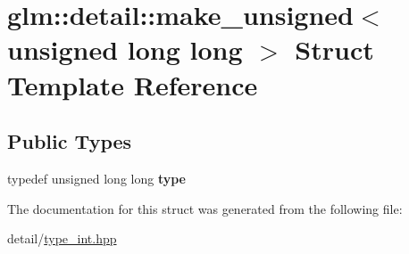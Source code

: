 \hypertarget{structglm_1_1detail_1_1make__unsigned_3_01unsigned_01long_01long_01_4}{\section{glm\-:\-:detail\-:\-:make\-\_\-unsigned$<$ unsigned long long $>$ Struct Template Reference}
\label{structglm_1_1detail_1_1make__unsigned_3_01unsigned_01long_01long_01_4}
}
\subsection*{Public Types}
\begin{DoxyCompactItemize}
\item 
\hypertarget{structglm_1_1detail_1_1make__unsigned_3_01unsigned_01long_01long_01_4_a3f3f1eb1cbdd286e6cb4afb5fa71d5c7}{typedef unsigned long long {\bfseries type}}\label{structglm_1_1detail_1_1make__unsigned_3_01unsigned_01long_01long_01_4_a3f3f1eb1cbdd286e6cb4afb5fa71d5c7}

\end{DoxyCompactItemize}


The documentation for this struct was generated from the following file\-:\begin{DoxyCompactItemize}
\item 
detail/\hyperlink{type__int_8hpp}{type\-\_\-int.\-hpp}\end{DoxyCompactItemize}
